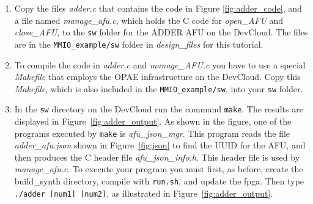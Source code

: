 \documentclass[11pt, twoside, pdftex]{article}
\begin{document}
\begin{enumerate}
    \item Copy the files {\it adder.c} that contains the code in Figure \ref{fig:adder_code}, and a file named {\it manage\_afu.c}, which holds the C code for {\it open\_AFU} and {\it close\_AFU}, to the \texttt{sw} folder for the ADDER AFU on the DevCloud. The files are in the \texttt{MMIO\_example/sw} folder in {\it design\_files} for this tutorial.
    \item To compile the code in {\it adder.c} and {\it manage\_AFU.c} you have to use a special {\it Makefile} that employs the OPAE infrastructure on the DevCloud. Copy this {\it Makefile}, which is also included in the \texttt{MMIO\_example/sw}, into your \texttt{sw} folder. 
    \item In the \texttt{sw} directory on the DevCloud run the command \texttt{make}. The results are displayed in Figure~\ref{fig:adder_output}. As shown in the figure, one of the programs executed by \texttt{make} is {\it afu\_json\_mgr}. This program reads the file {\it adder\_afu.json} shown in Figure~\ref{fig:json} to find the UUID for the AFU, and then produces the C header file {\it afu\_json\_info.h}. This header file is used by {\it manage\_afu.c}. To execute your program you must first, as before, create the build\_synth directory, compile with \texttt{run.sh}, and update the fpga. Then type
    \texttt{./adder [num1] [num2]}, as illustrated in Figure~\ref{fig:adder_output}.
\end{enumerate}
\end{document}
